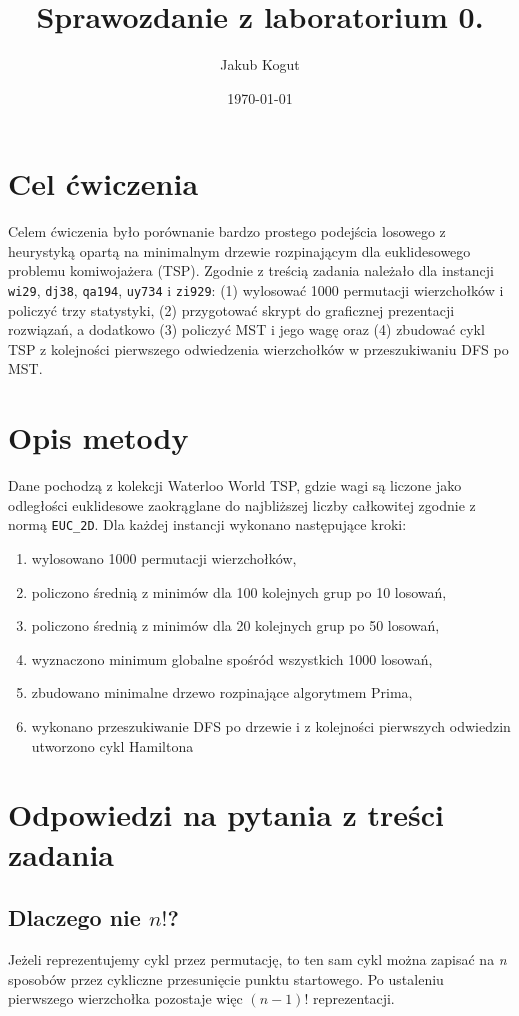 \documentclass[12pt,a4paper]{article}
\title{Sprawozdanie z laboratorium 0.}
\author{Jakub Kogut}
\date{\today}
\begin{document}
\maketitle

\section{Cel ćwiczenia}
Celem ćwiczenia było porównanie bardzo prostego podejścia losowego z heurystyką opartą
na minimalnym drzewie rozpinającym dla euklidesowego problemu komiwojażera (TSP).
Zgodnie z treścią zadania należało dla instancji \texttt{wi29}, \texttt{dj38}, \texttt{qa194},
\texttt{uy734} i \texttt{zi929}:
(1) wylosować \num{1000} permutacji wierzchołków i policzyć trzy statystyki,
(2) przygotować skrypt do graficznej prezentacji rozwiązań,
a dodatkowo
(3) policzyć MST i jego wagę oraz
(4) zbudować cykl TSP z kolejności pierwszego odwiedzenia wierzchołków w przeszukiwaniu DFS po MST.

\section{Opis metody}
Dane pochodzą z kolekcji Waterloo World TSP, gdzie wagi są liczone jako odległości euklidesowe
zaokrąglane do najbliższej liczby całkowitej zgodnie z normą \texttt{EUC\_2D}.
Dla każdej instancji wykonano następujące kroki:
\begin{enumerate}
    \item wylosowano \num{1000} permutacji wierzchołków,
    \item policzono średnią z minimów dla \num{100} kolejnych grup po \num{10} losowań,
    \item policzono średnią z minimów dla \num{20} kolejnych grup po \num{50} losowań,
    \item wyznaczono minimum globalne spośród wszystkich \num{1000} losowań,
    \item zbudowano minimalne drzewo rozpinające algorytmem Prima,
    \item wykonano przeszukiwanie DFS po drzewie i z kolejności pierwszych odwiedzin utworzono cykl Hamiltona
\end{enumerate}

\section{Odpowiedzi na pytania z treści zadania}
\subsection*{Dlaczego nie \texorpdfstring{$n!$}{n!}?}
Jeżeli reprezentujemy cykl przez permutację, to ten sam cykl można zapisać na \emph{n}
sposobów przez cykliczne przesunięcie punktu startowego. Po ustaleniu pierwszego wierzchołka
pozostaje więc \((n-1)!\) reprezentacji. 
\end{document}
